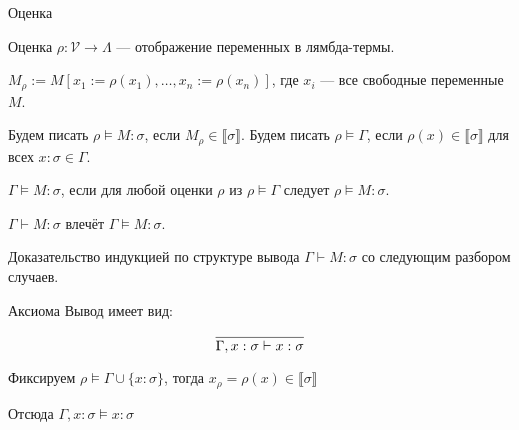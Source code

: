 \documentclass[aspectratio=169]{beamer}
\begin{document}
\begin{frame}{Оценка}
\begin{dfn}
Оценка $\rho: \mathcal{V} \rightarrow \Lambda$ --- отображение переменных в лямбда-термы.

$M_\rho := M[x_1 := \rho(x_1), \dots, x_n := \rho(x_n)]$, где $x_i$ --- все свободные переменные $M$.

Будем писать $\rho \models M:\sigma$, если $M_\rho \in \llbracket\sigma\rrbracket$.
Будем писать $\rho \models \Gamma$, если $\rho(x) \in \llbracket\sigma\rrbracket$ для всех $x : \sigma \in \Gamma$.

$\Gamma \models M:\sigma$, если для любой оценки $\rho$ из $\rho\models\Gamma$ следует $\rho \models M:\sigma$.
\end{dfn}

\begin{thm}$\Gamma\vdash M:\sigma$ влечёт $\Gamma\models M:\sigma$.
\end{thm}

Доказательство индукцией по структуре вывода $\Gamma\vdash M:\sigma$ со следующим разбором случаев.

\end{frame}

\begin{frame}{Аксиома}
Вывод имеет вид:

$$\infer{\Gamma, x : \sigma \vdash x:\sigma}{}$$

Фиксируем $\rho \models \Gamma\cup\{x : \sigma\}$, тогда
$x_\rho = \rho(x)\in\llbracket\sigma\rrbracket$

Отсюда $\Gamma, x : \sigma \models x : \sigma$
\end{frame}
\end{document}
